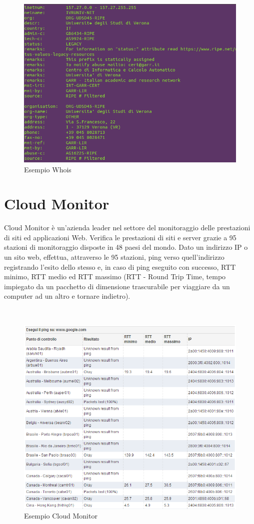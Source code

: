 \documentclass[a4paper,11pt]{book}
\begin{document}
\begin{figure}[!ht]
\centering
\includegraphics[scale = 0.7]{Whois.png}
\caption{Esempio Whois}
\end{figure}

\clearpage

\section{Cloud Monitor}
Cloud Monitor \`e un'azienda leader nel settore del monitoraggio delle prestazioni di siti ed applicazioni Web. Verifica le prestazioni di siti e server grazie a 95 stazioni di monitoraggio disposte in 48 paesi del mondo. 
Dato un indirizzo IP o un sito web, effettua, attraverso le 95 stazioni, ping verso quell'indirizzo registrando l'esito dello stesso e, in caso di ping eseguito con successo, RTT minimo, RTT medio ed RTT massimo (RTT - Round Trip Time, tempo impiegato da un pacchetto di dimensione trascurabile per viaggiare da un computer ad un altro e tornare indietro). 

~

\begin{figure}[!ht]
\centering
\includegraphics[scale = 0.7]{Cloud_Monitor.png}
\caption{Esempio Cloud Monitor}
\end{figure}
\end{document}

